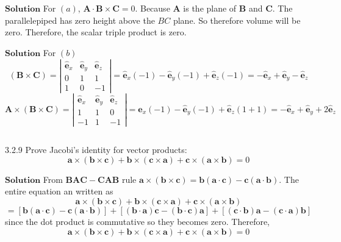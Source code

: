 \documentclass{article}
\begin{document}
\begin{flushleft}
$\boxed{\textbf{Solution}}$ For $(a)$, $\mathbf{A} \cdot \mathbf{B} \times \mathbf{C}=0 .$ Because $\mathbf{A}$ is the plane of $\mathbf{B}$ and $\mathbf{C}$. The parallelepiped has zero height above the $BC$ plane. So therefore volume will be zero.
Therefore, the scalar triple product is zero.




$\boxed{\textbf{Solution}}$ For $(b)$ 
$$
(\mathbf{B} \times \mathbf{C})=\left|\begin{array}{ccc}
\hat{\mathbf{e}}_{x} & \hat{\mathbf{e}}_{y} & \hat{\mathbf{e}}_{z} \\
0 & 1 & 1 \\
1 & 0 & -1
\end{array}\right|=\hat{\mathbf{e}}_{x}(-1)-\hat{\mathbf{e}}_{y}(-1)+\hat{\mathbf{e}}_{z}(-1)=-\hat{\mathbf{e}}_{x}+\hat{\mathbf{e}}_{y}-\hat{\mathbf{e}}_{z}
$$
$$
\mathbf{A} \times(\mathbf{B} \times \mathbf{C})=\left|\begin{array}{ccc}
\hat{\mathbf{e}}_{x} & \hat{\mathbf{e}}_{y} & \hat{\mathbf{e}}_{z} \\
1 & 1 & 0 \\
-1 & 1 & -1
\end{array}\right|=\hat{\mathbf{e}}_{x}(-1)-\hat{\mathbf{e}}_{y}(-1)+\hat{\mathbf{e}}_{z}(1+1)=-\hat{\mathbf{e}}_{x}+\hat{\mathbf{e}}_{y}+2 \hat{\mathbf{e}}_{z}
$$


$$$$

\begin{mybox}{3.2.9}
Prove Jacobi's identity for vector products:
$$
\mathbf{a} \times(\mathbf{b} \times \mathbf{c})+\mathbf{b} \times(\mathbf{c} \times \mathbf{a})+\mathbf{c} \times(\mathbf{a} \times \mathbf{b})=0
$$
\end{mybox}


$\boxed{\textbf{Solution}}$ From $\mathbf{BA}\mathbf{C}-\mathbf{C}\mathbf{AB}$ rule $\mathbf{a}\times(\mathbf{b} \times \mathbf{c})=\mathbf{b}(\mathbf{a}\cdot \mathbf{c})-\mathbf{c}(\mathbf{a} \cdot \mathbf{b}).$ The entire equation an written as
$$
\mathbf{a}\times(\mathbf{b} \times \mathbf{c})+\mathbf{b} \times(\mathbf{c} \times \mathbf{a})+\mathbf{c} \times(\mathbf{a} \times \mathbf{b})$$
$$=[\mathbf{b}(\mathbf{a} \cdot \mathbf{c})-\mathbf{c}(\mathbf{a} \cdot \mathbf{b})]+[(\mathbf{b} \cdot \mathbf{a}) \mathbf{c}-(\mathbf{b} \cdot \mathbf{c}) \mathbf{a}]+[(\mathbf{c} \cdot \mathbf{b}) \mathbf{a}-(\mathbf{c} \cdot \mathbf{a}) \mathbf{b}]
$$
since the dot product is commutative so they becomes zero.
Therefore, $$ \mathbf{a}\times(\mathbf{b} \times \mathbf{c})+\mathbf{b} \times(\mathbf{c} \times \mathbf{a})+\mathbf{c} \times(\mathbf{a} \times \mathbf{b})=0$$



\end{flushleft}
\end{document}
